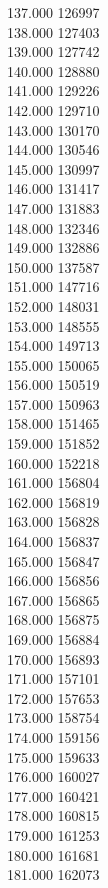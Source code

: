{ 137.000	126997 \\
 138.000	127403 \\
 139.000	127742 \\
 140.000	128880 \\
 141.000	129226 \\
 142.000	129710 \\
 143.000	130170 \\
 144.000	130546 \\
 145.000	130997 \\
 146.000	131417 \\
 147.000	131883 \\
 148.000	132346 \\
 149.000	132886 \\
 150.000	137587 \\
 151.000	147716 \\
 152.000	148031 \\
 153.000	148555 \\
 154.000	149713 \\
 155.000	150065 \\
 156.000	150519 \\
 157.000	150963 \\
 158.000	151465 \\
 159.000	151852 \\
 160.000	152218 \\
 161.000	156804 \\
 162.000	156819 \\
 163.000	156828 \\
 164.000	156837 \\
 165.000	156847 \\
 166.000	156856 \\
 167.000	156865 \\
 168.000	156875 \\
 169.000	156884 \\
 170.000	156893 \\
 171.000	157101 \\
 172.000	157653 \\
 173.000	158754 \\
 174.000	159156 \\
 175.000	159633 \\
 176.000	160027 \\
 177.000	160421 \\
 178.000	160815 \\
 179.000	161253 \\
 180.000	161681 \\
 181.000	162073 \\
}
